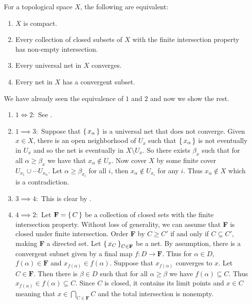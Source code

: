 \documentclass[letterpaper, 11pt, oneside]{book}
\begin{document}
\begin{thrm}\label{thrm: compact_iff_FIP_iff_universal_etc}
  For a topological space $X$, the following are equivalent:
  \begin{enumerate}
  \item $X$ is compact.
  \item Every collection of closed subsets of $X$ with the finite intersection property has non-empty intersection.
  \item Every universal net in $X$ converges.
  \item Every net in $X$ has a convergent subset.
  \end{enumerate}
\end{thrm}
\begin{pf}
  We have already seen the equivalence of $1$ and $2$ and now we show the rest.
  \begin{enumerate}
  \item[] $1 \iff 2\colon$ See .
  \item[] $1 \implies 3\colon$ Suppose that $\set{x_{\alpha}}$ is a universal net that does not converge.
        Given $x \in X$, there is an open neighborhood of $U_{x}$ such that $\set{x_{\alpha}}$ is not eventually in  $U_{x}$ and so the net is eventually in $X \setminus U_{x}$.
        So there exists $\beta_{x}$ such that for all $\alpha \geq \beta_{x}$ we have that $x_{\alpha} \notin U_{x}$.
        Now cover $X$ by some finite cover $U_{x_{1}} \cup \cdots U_{x_{n}}$.
        Let $\alpha \geq \beta_{x_{i}}$ for all $i$, then $x_{\alpha} \notin U_{x_{i}}$ for any $i$.
        Thus $x_{\alpha} \notin X$ which is a contradiction.
  \item[] $3 \implies 4\colon$ This is clear by .

  \item[] $4 \implies 2\colon$ Let $\textbf{F} = \set{C}$ be a collection of closed sets with the finite intersection property.
        Without loss of generality, we can assume that \textbf{F} is closed under finite intersection.
        Order \textbf{F} by $C \geq C'$ if and only if $C \subseteq C'$, making \textbf{F} a directed set.
        Let $\set{x_{C}}_{C \in \textbf{F}}$ be a net.
        By assumption, there is a convergent subnet given by a final map $f\colon D \to \textbf{F}$.
        Thus for $\alpha \in D$, $f(\alpha) \in \textbf{F}$ and $x_{f(\alpha)} \in f(\alpha)$.
        Suppose that $x_{f(\alpha)}$ converges to $x$.
        Let $C \in \textbf{F}$.
        Then there is $\beta \in D$ such that for all $\alpha \geq \beta$ we have $f(\alpha) \subseteq C$.
        Thus $x_{f(\alpha)} \in f(\alpha) \subseteq C$.
        Since $C$ is closed, it contains its limit points and $x \in C$ meaning that $x \in \bigcap_{C \in \textbf{F}} C$ and the total intersection is nonempty.
  \end{enumerate}
\end{pf}
\end{document}

